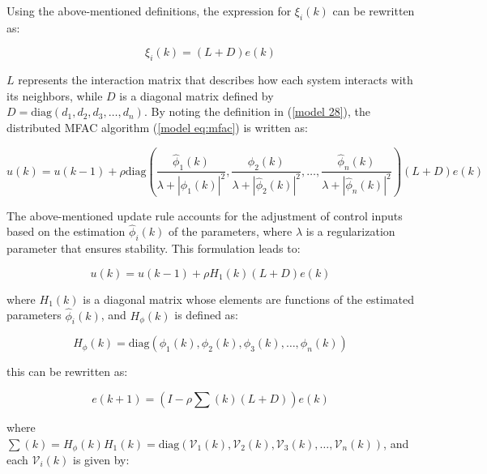 \documentclass[journal,onecolumn]{IEEEtran}
\begin{document}
Using the above-mentioned definitions, the expression for \(\xi_i(k)\) can be rewritten as:

\begin{equation}
    \label{model 28}
    \xi_i(k) = (L + D) e(k)
\end{equation}

\(L\) represents the interaction matrix that describes how each system interacts with its neighbors, while \(D\) is a diagonal matrix defined by \(D = \text{diag}(d_1, d_2, d_3, \dots, d_n)\). By noting the definition in (\ref{model 28}), the distributed MFAC algorithm (\ref{model eq:mfac}) is written as:

\[
u(k) = u(k-1) + \rho   \text{diag}\left(\frac{\hat{\phi}_1(k)}{\lambda + |\hat{\phi}_1(k)|^2}, \frac{\hat{\phi}_2(k)}{\lambda + |\hat{\phi}_2(k)|^2}, \dots, \frac{\hat{\phi}_n(k)}{\lambda + |\hat{\phi}_n(k)|^2}\right) (L + D) e(k)
\]

The above-mentioned update rule accounts for the adjustment of control inputs based on the estimation \(\hat{\phi}_i(k)\) of the parameters, where \(\lambda\) is a regularization parameter that ensures stability. This formulation leads to:

\begin{equation}
    \label{model 29}
    u(k) = u(k-1) + \rho H_1(k) (L + D) e(k)
\end{equation}

where \(H_1(k)\) is a diagonal matrix whose elements are functions of the estimated parameters \(\hat{\phi}_i(k)\), and \(H_\phi(k)\) is defined as:

\[
H_\phi(k) = \text{diag}(\phi_1(k), \phi_2(k), \phi_3(k), \dots, \phi_n(k))
\]


this can be rewritten as:

\begin{equation}
    \label{model 30}
    e(k+1) = (I - \rho \sum(k) (L+D)) e(k)
\end{equation}

where $\sum(k) = H_\phi(k)H_1(k) = \text{diag}(\mathcal{V}_1(k), \mathcal{V}_2(k), \mathcal{V}_3(k), \dots, \mathcal{V}_n(k))$, and each \(\mathcal{V}_i(k)\) is given by:




\end{document}
